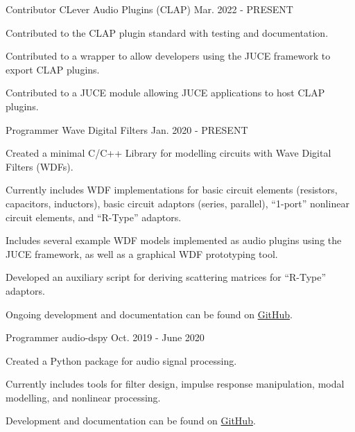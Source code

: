 \begin{cventries}
  \cventry
    {Contributor} %
    {CLever Audio Plugins (CLAP)} %
    {} %
    {Mar. 2022 - PRESENT} %
    {
      \begin{cvitems} %
        \item {Contributed to the CLAP plugin standard with testing and documentation.}
        \item {Contributed to a wrapper to allow developers using the JUCE framework to export CLAP plugins.}
        \item {Contributed to a JUCE module allowing JUCE applications to host CLAP plugins.}
      \end{cvitems}
    }


  \cventry
    {Programmer} %
    {Wave Digital Filters} %
    {} %
    {Jan. 2020 - PRESENT} %
    {
      \begin{cvitems} %
        \item {Created a minimal C/C++ Library for modelling circuits with Wave Digital Filters (WDFs).}
        \item {Currently includes WDF implementations for basic circuit elements (resistors, capacitors, inductors),
               basic circuit adaptors (series, parallel), ``1-port'' nonlinear circuit elements, and ``R-Type'' adaptors.}
        \item {Includes several example WDF models implemented as audio plugins using the JUCE framework,
               as well as a graphical WDF prototyping tool.}
        \item {Developed an auxiliary script for deriving scattering matrices for ``R-Type'' adaptors.}
        \item {Ongoing development and documentation can be found on \href{https://github.com/jatinchowdhury18/WaveDigitalFilters}{GitHub}.}
      \end{cvitems}
    }

  \cventry
    {Programmer} %
    {audio-dspy} %
    {} %
    {Oct. 2019 - June 2020} %
    {
      \begin{cvitems} %
        \item {Created a Python package for audio signal processing.}
        \item {Currently includes tools for filter design, impulse response manipulation, modal modelling, and nonlinear processing.}
        \item {Development and documentation can be found on \href{https://github.com/jatinchowdhury18/audio_dspy}{GitHub}.}
      \end{cvitems}
    }


\end{cventries}
